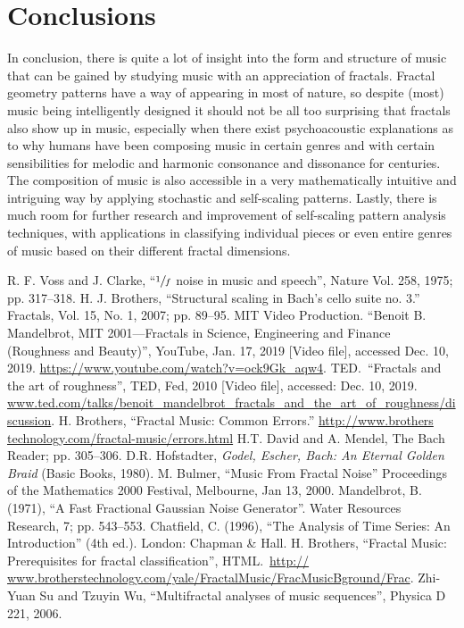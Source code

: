 \documentclass{article}
\begin{document}
\section{Conclusions}

In conclusion, there is quite a lot of insight into the form and structure of
music that can be gained by studying music with an appreciation of fractals.
Fractal geometry patterns have a way of appearing in most of nature, so despite
(most) music being intelligently designed it should not be all too surprising
that fractals also show up in music, especially when there exist psychoacoustic
explanations as to why humans have been composing music in certain genres and
with certain sensibilities for melodic and harmonic consonance and dissonance
for centuries.
The composition of music is also accessible in a very mathematically intuitive
and intriguing way by applying stochastic and self-scaling patterns.
Lastly, there is much room for further research and improvement of self-scaling
pattern analysis techniques, with applications in classifying individual pieces
or even entire genres of music based on their different fractal dimensions.

\begin{thebibliography}{9}
    R. F. Voss and J. Clarke,
    ``$\sfrac 1 f$ noise in music and speech'',
    Nature Vol. 258, 1975; pp. 317--318.
    H. J. Brothers,
    ``Structural scaling in Bach's cello suite no. 3.''
    Fractals, Vol. 15, No. 1, 2007; pp. 89--95.
    MIT Video Production.
    ``Benoit B. Mandelbrot, MIT 2001---Fractals in Science, Engineering and Finance (Roughness and Beauty)'',
        YouTube, Jan. 17, 2019 [Video file],
    accessed Dec. 10, 2019.
    \url{https://www.youtube.com/watch?v=ock9Gk_aqw4}.
    TED.\
    ``Fractals and the art of roughness'',
    TED, Fed, 2010 [Video file],
    accessed: Dec. 10, 2019.
    \url{www.ted.com/talks/benoit_mandelbrot_fractals_and_the_art_of_roughness/discussion}.
\bibitem{5}
    H. Brothers,
    ``Fractal Music: Common Errors.''
    \url{http://www.brothers technology.com/fractal-music/errors.html}
\bibitem{6}
    H.T. David and A. Mendel,
    The Bach Reader; pp. 305--306.
    D.R. Hofstadter,
    \emph{Godel, Escher, Bach: An Eternal Golden Braid} (Basic Books, 1980).
\bibitem{8}
    M. Bulmer,
    ``Music From Fractal Noise''
    Proceedings of the Mathematics 2000 Festival, Melbourne, Jan 13, 2000.
\bibitem{9}
    Mandelbrot, B. (1971),
    ``A Fast Fractional Gaussian Noise Generator''.
    Water Resources Research, 7; pp. 543–553.
    Chatfield, C. (1996),
    ``The Analysis of Time Series: An Introduction'' (4th ed.).
    London: Chapman \& Hall.
    H. Brothers,
    ``Fractal Music: Prerequisites for fractal classification'', HTML.\
    \url{http:// www.brotherstechnology.com/yale/FractalMusic/FracMusicBground/Frac}.
\bibitem{12}
    Zhi-Yuan Su and Tzuyin Wu,
    ``Multifractal analyses of music sequences'',
    Physica D 221, 2006.
\end{thebibliography}
\end{document}
